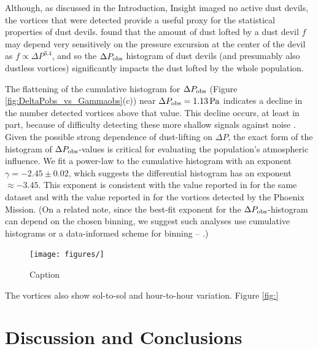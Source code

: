 \documentclass{aastex63}
\begin{document}
Although, as discussed in the Introduction, Insight imaged no active dust devils, the vortices that were detected provide a useful proxy for the statistical properties of dust devils. \citet{2010Icar..206..306N} found that the amount of dust lofted by a dust devil $f$ may depend very sensitively on the pressure excursion at the center of the devil as $f \propto \Delta P^{3.4}$, and so the $\Delta P_{\rm obs}$ histogram of dust devils (and presumably also dustless vortices) significantly impacts the dust lofted by the whole population. 

The flattening of the cumulative histogram for $\Delta P_{\rm obs}$ (Figure \ref{fig:DeltaPobs_vs_Gammaobs}(c)) near $\Delta P_{\rm obs} = 1.13\,{\rm Pa}$ indicates a decline in the number detected vortices above that value. This decline occurs, at least in part, because of difficulty detecting these more shallow signals against noise  \citep{2018Icar..299..166J}. Given the possible strong dependence of dust-lifting on $\Delta P$, the exact form of the histogram of $\Delta P_{\rm obs}$-values is critical for evaluating the population's atmospheric influence. We fit a power-law to the cumulative histogram with an exponent $\gamma = -2.45\pm0.02$, which suggests the differential histogram has an exponent $\approx -3.45$. This exponent is consistent with the value reported in  \citet{2020arXiv200501134S} for the same dataset and with the value reported in \citet{2018Icar..299..166J} for the vortices detected by the Phoenix Mission. (On a related note, since the best-fit exponent for the $\Delta P_{\rm obs}$-histogram can depend on the chosen binning, we suggest such analyses use cumulative histograms or a data-informed scheme for binning -- \citealp{2016SSRv..203..277L}.)

\begin{figure}
    \centering
    \texttt{[image: figures/]}
    \caption{Caption}
    \label{fig:my_label}
\end{figure}

The vortices also show sol-to-sol and hour-to-hour variation. Figure \ref{fig:}

\section{Discussion and Conclusions}
\label{sec:Discussion and Conclusions}
\end{document}
